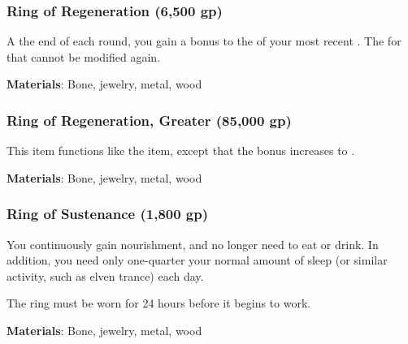 \lowercase{\hypertarget{item:Ring of Regeneration}{}}\label{item:Ring of Regeneration}
\hypertarget{item:Ring of Regeneration}{\subsubsection{Ring of Regeneration\hfill{} (6,500 gp)}}

A the end of each round, you gain a  bonus to the  of your most recent .
The  for that  cannot be modified again.



\vspace{0.25em}
\textbf{Materials}: Bone, jewelry, metal, wood


\lowercase{\hypertarget{item:Ring of Regeneration, Greater}{}}\label{item:Ring of Regeneration, Greater}
\hypertarget{item:Ring of Regeneration, Greater}{\subsubsection{Ring of Regeneration, Greater\hfill{} (85,000 gp)}}

This item functions like the  item, except that the bonus increases to .



\vspace{0.25em}
\textbf{Materials}: Bone, jewelry, metal, wood


\lowercase{\hypertarget{item:Ring of Sustenance}{}}\label{item:Ring of Sustenance}
\hypertarget{item:Ring of Sustenance}{\subsubsection{Ring of Sustenance\hfill{} (1,800 gp)}}

You continuously gain nourishment, and no longer need to eat or drink.
In addition, you need only one-quarter your normal amount of sleep (or similar activity, such as elven trance) each day.

The ring must be worn for 24 hours before it begins to work.



\vspace{0.25em}
\textbf{Materials}: Bone, jewelry, metal, wood



